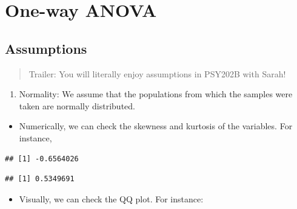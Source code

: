 \documentclass[
]{book}
\newenvironment{Shaded}{\begin{snugshade}}{\end{snugshade}}
\newcommand{\CommentTok}[1]{\textcolor[rgb]{0.56,0.35,0.01}{\textit{#1}}}
\newcommand{\FunctionTok}[1]{\textcolor[rgb]{0.13,0.29,0.53}{\textbf{#1}}}
\newcommand{\NormalTok}[1]{#1}
\newcommand{\SpecialCharTok}[1]{\textcolor[rgb]{0.81,0.36,0.00}{\textbf{#1}}}
\providecommand{\tightlist}{%
  \setlength{\itemsep}{0pt}\setlength{\parskip}{0pt}}
\begin{document}
\section{One-way ANOVA}\label{one-way-anova}

\subsection{Assumptions}\label{assumptions}

\begin{quote}
Trailer: You will literally enjoy assumptions in PSY202B with Sarah!
\end{quote}

\begin{enumerate}
\def\labelenumi{\arabic{enumi}.}
\tightlist
\item
  Normality: We assume that the populations from which the samples were taken are normally distributed.
\end{enumerate}

\begin{itemize}
\tightlist
\item
  Numerically, we can check the skewness and kurtosis of the variables. For instance,
\end{itemize}

\begin{Shaded}
\end{Shaded}

\begin{verbatim}
## [1] -0.6564026
\end{verbatim}

\begin{Shaded}
\end{Shaded}

\begin{verbatim}
## [1] 0.5349691
\end{verbatim}

\begin{itemize}
\tightlist
\item
  Visually, we can check the QQ plot. For instance:
\end{itemize}
\end{document}
